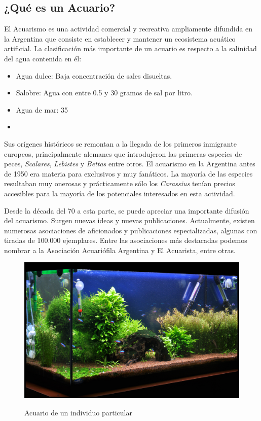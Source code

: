\subsection{¿Qué es un Acuario?}
\label{sec:acuario}

El Acuarismo es una actividad comercial y recreativa ampliamente difundida en la Argentina que consiste en establecer y mantener un ecosistema acuático artificial. La clasificación más importante de un acuario es respecto a la salinidad del agua contenida en él:

\begin{itemize}
\item Agua dulce: Baja concentración de sales disueltas.
\item Salobre: Agua con entre 0.5 y 30 gramos de sal por litro.
\item Agua de mar: 35%
\item 
\end{itemize}

Sus orígenes históricos se remontan a la llegada de los primeros inmigrante europeos, principalmente alemanes que introdujeron las primeras especies de peces, \textit{Scalares}, \textit{Lebistes} y \textit{Bettas} entre otros.
El acuarismo en la Argentina antes de 1950 era materia para exclusivos y muy fanáticos. La mayoría de las especies resultaban muy onerosas y prácticamente sólo los \textit{Carassius} tenían precios accesibles para la mayoría de los potenciales interesados en esta actividad.

Desde la década del 70 a esta parte, se puede apreciar una importante difusión del acuarismo. Surgen nuevas ideas y nuevas publicaciones.  Actualmente, existen numerosas asociaciones de aficionados y publicaciones especializadas, algunas con tiradas de 100.000 ejemplares.  Entre las asociaciones más destacadas podemos nombrar a la Asociación Acuariófila Argentina y El Acuarista, entre otras.


\begin{figure}[]
	\centering
    \includegraphics[width=.5\textwidth]{./Figures/acuarioHobby3.jpg}
	\label{fig.acuarioHobby}
	\caption{Acuario de un individuo particular}
\end{figure}       


